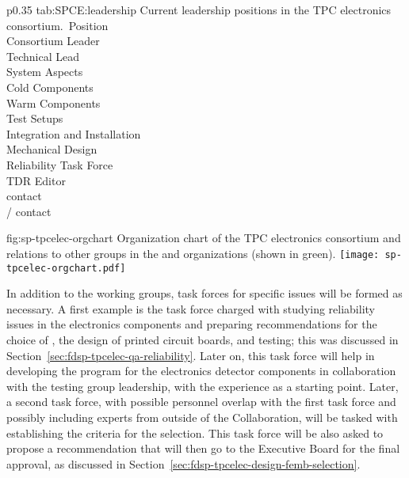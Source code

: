 \begin{dunetable}
{p{0.35\textwidth}}
{tab:SPCE:leadership}
{Current leadership positions in the TPC electronics consortium.}\
Position \\ \toprowrule
Consortium Leader \\ \colhline 
Technical Lead \\ \colhline 
System Aspects \\ \colhline 
Cold Components \\ \colhline 
Warm Components \\ \colhline 
Test Setups \\ \colhline 
Integration and Installation \\ \colhline
Mechanical Design \\ \colhline 
Reliability Task Force \\ \colhline 
TDR Editor \\ \colhline 
{} contact \\ \colhline 
{}/ contact \\
\end{dunetable}

\begin{dunefigure}
{fig:sp-tpcelec-orgchart}
{Organization chart of the TPC electronics consortium and relations to
other groups in the \dword{lbnf} and \dword{dune} organizations (shown in green).}
\texttt{[image: sp-tpcelec-orgchart.pdf]}
\end{dunefigure}


In addition to the working groups, task forces for specific issues 
will be formed as necessary. A first example is the task force
charged with studying reliability issues in the  electronics 
components and preparing recommendations for the choice of 
, the design of printed circuit boards, and testing; this
was discussed in Section~\ref{sec:fdsp-tpcelec-qa-reliability}. 
Later on, this task force will help in developing the \dword{qc} 
program for the \dword{tpc} electronics detector components in collaboration
with the testing group leadership, with the \dword{pdsp} 
experience as a starting point. Later, a second task force, with possible
personnel overlap with the first task force and possibly including experts
from outside of the \dword{dune} Collaboration, will be tasked with establishing the
criteria for the \dword{asic} selection. This task force will
be also asked to propose a recommendation that will then go to
the  Executive Board for the final approval, as discussed
in Section~\ref{sec:fdsp-tpcelec-design-femb-selection}.

